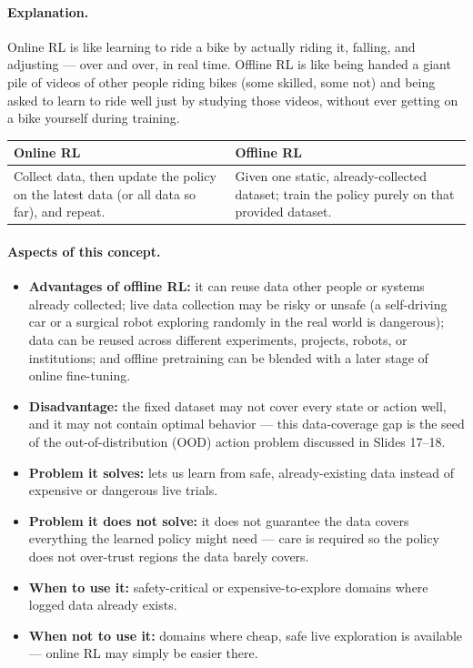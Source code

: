 \documentclass[11pt]{article}
\begin{document}
\paragraph{Explanation.}
Online RL is like learning to ride a bike by actually riding it, falling, and adjusting
--- over and over, in real time. Offline RL is like being handed a giant pile of videos
of other people riding bikes (some skilled, some not) and being asked to learn to ride
well just by studying those videos, without ever getting on a bike yourself during
training.

\begin{center}
\begin{tabular}{@{}p{4.5cm}p{9cm}@{}}
\toprule
Online RL & Offline RL \\
\midrule
Collect data, then update the policy on the latest data (or all data so far), and
repeat. & Given one static, already-collected dataset; train the policy purely on that
provided dataset. \\
\bottomrule
\end{tabular}
\end{center}

\paragraph{Aspects of this concept.}
\begin{itemize}
\item \textbf{Advantages of offline RL:} it can reuse data other people or systems
already collected; live data collection may be risky or unsafe (a self-driving car or a
surgical robot exploring randomly in the real world is dangerous); data can be reused
across different experiments, projects, robots, or institutions; and offline pretraining
can be blended with a later stage of online fine-tuning.
\item \textbf{Disadvantage:} the fixed dataset may not cover every state or action well,
and it may not contain optimal behavior --- this data-coverage gap is the seed of the
out-of-distribution (OOD) action problem discussed in Slides 17--18.
\item \textbf{Problem it solves:} lets us learn from safe, already-existing data instead
of expensive or dangerous live trials.
\item \textbf{Problem it does not solve:} it does not guarantee the data covers
everything the learned policy might need --- care is required so the policy does not
over-trust regions the data barely covers.
\item \textbf{When to use it:} safety-critical or expensive-to-explore domains where
logged data already exists.
\item \textbf{When not to use it:} domains where cheap, safe live exploration is
available --- online RL may simply be easier there.
\end{itemize}
\end{document}
